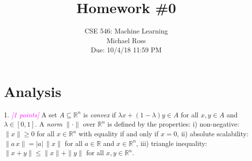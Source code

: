 \documentclass{article}
\date{{}}
\newcommand{\field}[1]{\mathbb{#1}}
\newcommand{\1}{\mathbf{1}}
\newcommand{\R}{\field{R}} %
\newcommand{\grade}[1]{\small\textcolor{magenta}{\emph{[#1 points]}} \normalsize}
\begin{document}
\title{Homework \#0}
\author{\normalsize{CSE 546: Machine Learning}\\
\normalsize{Michael Ross} \\
\normalsize{Due: 10/4/18  11:59 PM}}
\maketitle


\section{Analysis}

1. \grade{1} A set $A \subseteq \R^n$ is \emph{convex} if $\lambda x + (1-\lambda) y \in A$ for all $x,y\in A$ and $\lambda \in [0,1]$.
A \emph{norm} $\|\cdot\|$ over $\R^n$ is defined by the properties:
i) non-negative: $\|x\|\geq 0$ for all $x \in \R^n$ with equality if and only if $x=0$,
ii) absolute scalability: $\|a \, x\| = |a| \, \|x\|$ for all $a \in \R$ and $x \in \R^n$, iii) triangle inequality: $\|x+y\| \leq \|x\| + \|y\|$ for all $x,y \in \R^n$.
\end{document}
